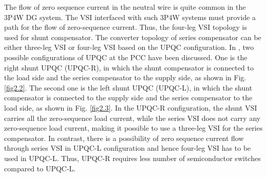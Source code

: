 The flow of zero sequence current in the neutral wire is quite common in the 3P4W DG system. The VSI interfaced with such 3P4W systems must provide a path for the flow of zero-sequence current. Thus, the four-leg VSI topology is used for shunt compensator. The converter topology of series compensator can be either three-leg VSI or four-leg VSI based on the UPQC configuration. In \cite{ghosh2002power,6095377}, two possible configurations of UPQC at the PCC have been discussed. One is the right shunt UPQC (UPQC-R), in which the shunt compensator is connected to the load side and the series compensator to the supply side, as shown in Fig. \ref{fig2.2}. The second one is the left shunt UPQC (UPQC-L), in which the shunt compensator is connected to the supply side and the series compensator to the load side, as shown in Fig. \ref{fig2.3}. In the UPQC-R configuration, the shunt VSI carries all the zero-sequence load current, while the series VSI does not carry any zero-sequence load current, making it possible to use a three-leg VSI for the series compensator. In contrast, there is a possibility of zero sequence current flow through series VSI in UPQC-L configuration and hence four-leg VSI has to be used in UPQC-L. Thus, UPQC-R requires less number of semiconductor switches compared to UPQC-L.      



